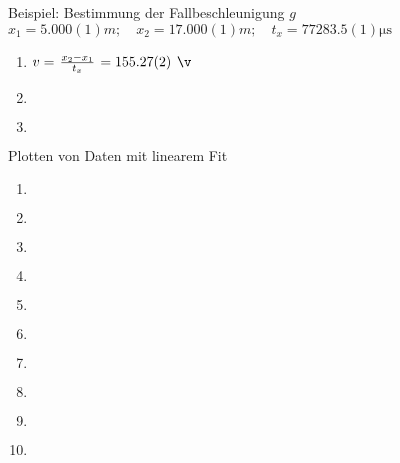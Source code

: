\documentclass{alex_gp}
\begin{document}
\begin{mybox}{Beispiel: Bestimmung der Fallbeschleunigung \( g \)}
	\centering \( x_1 = 5.000(1) \unit{m};\quad x_2 = 17.000(1) \unit{m};\quad t_x = 77283.5(1) \unit{\micro\s} \)
	\tcblower
	\begin{enumerate}
		\item \( v = \tfrac{x_2 - x_1}{t_x} = 155.27(2) \unit{\v} \)
	\tcbline
		\item \(  \)
	\tcbline
		\item \(  \)
	\end{enumerate}
\end{mybox}

\begin{mybox}{Plotten von Daten mit linearem Fit}
	\centering \(  \)
	\tcblower
	\begin{enumerate}
		\item \(  \)
		\tcbline
		\item \(  \)
		\tcbline
		\item \(  \)
		\tcbline
		\item \(  \)
		\tcbline
		\item \(  \)
		\tcbline
		\item \(  \)
		\tcbline
		\item \(  \)
		\tcbline
		\item \(  \)
		\tcbline
		\item \(  \)
		\tcbline
		\item \(  \)
	\end{enumerate}
\end{mybox}
\end{document}
